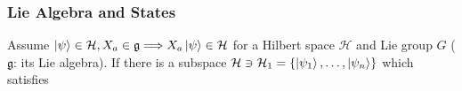 \subsubsection{Lie Algebra and States}
Assume $\ket{\psi}\in\mathcal H, X_a\in \mathfrak g \Longrightarrow X_a\ket{\psi}\in\mathcal H$ for a Hilbert space $\mathcal H$ and Lie group $G$ ($\mathfrak g$: its Lie algebra).
If there is a subspace $\mathcal H\ni\mathcal H_1=\{\ket{\psi_1},\dots,\ket{\psi_n}\}$ which satisfies 
